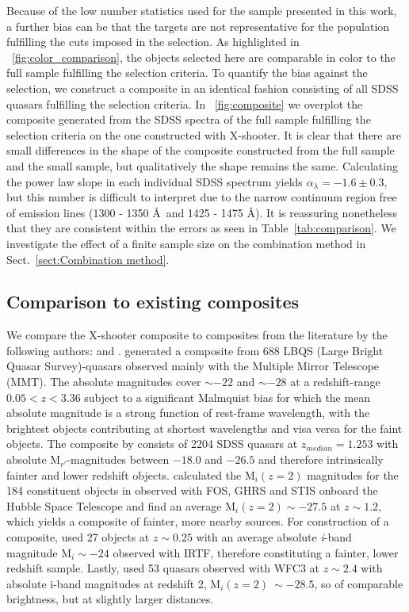 \documentclass{aa}    %
\newcommand{\figref}[1]{\ref{fig:#1}}
\newcommand{\Fig}[1]{\figurename~\figref{#1}}
\newcommand{\fig}[1]{\Fig{#1}}
\newcommand{\Tab}[1]{Table~\ref{tab:#1}}
\newcommand{\tab}[1]{\Tab{#1}}
\newcommand{\sectionname}{Sect.}
\newcommand{\Sect}[1]{\sectionname~\ref{sect:#1}}
\newcommand{\sect}[1]{\Sect{#1}}
\newcommand{\sectlabel}[1]{\label{sect:#1}}
\begin{document}
Because of the low number statistics used for the sample presented in this work, a
further bias can be that the targets are not representative for the
population fulfilling the cuts imposed in the selection. As
highlighted in \fig{color_comparison}, the objects selected here are comparable in color to the full sample fulfilling the selection criteria. To
quantify the bias against the selection, we construct a composite in
an identical fashion consisting of all SDSS quasars fulfilling the
selection criteria.  In \fig{composite} we overplot the composite
generated from the SDSS spectra of the full sample fulfilling the
selection criteria on the one constructed with X-shooter. It is clear
that there are small differences in the shape of the composite
constructed from the full sample and the small sample, but
qualitatively the shape remains the same. Calculating the power law
slope in each individual SDSS spectrum yields $\alpha_\lambda = -1.6\pm 0.3$,
but this number is difficult to interpret due to the narrow continuum
region free of emission lines (1300 - 1350 \AA~and 1425 - 1475
\AA). It is reassuring nonetheless that they are consistent within the
errors as seen in \tab{comparison}. We investigate the effect of a
finite sample size on the combination method in \sect{Combination method}.


\subsection{Comparison to existing composites} \sectlabel{comparison}
We compare the X-shooter composite to composites from the literature by the following authors:
\citet{Francis1991, VandenBerk2001, Telfer2002, Glikman2006} and
\citet{Lusso2015}. \citet{Francis1991} generated a composite from 688
LBQS (Large Bright Quasar Survey)-quasars observed mainly with the Multiple Mirror Telescope (MMT). The absolute magnitudes cover $\sim -22$
and $\sim -28$ at a redshift-range $0.05 < z < 3.36$ subject to a
significant Malmquist bias for which the mean absolute magnitude is a
strong function of rest-frame wavelength, with the brightest objects
contributing at shortest wavelengths and visa versa for the faint
objects. The composite by \citet{VandenBerk2001} consists of 2204 SDSS
quasars at $z_{median} = 1.253$ with absolute M$_{r'}$-magnitudes
between $-18.0$ and $-26.5$ and therefore intrinsically fainter and
lower redshift objects. \citet{Lusso2015} calculated the M$_i(z=2)$
magnitudes for the 184 constituent objects in \citet{Telfer2002}
observed with FOS, GHRS and STIS onboard the Hubble Space Telescope and find an average
M$_i(z=2) \sim -27.5$ at $z \sim 1.2$, which yields a composite of
fainter, more nearby sources. For construction of a composite,
\citet{Glikman2006} used 27 objects at $z \sim 0.25$ with an average
absolute \textit{i}-band magnitude M$_i \sim -24$ observed with IRTF,
therefore constituting a fainter, lower redshift sample. Lastly,
\citet{Lusso2015} used 53 quasars observed with WFC3 at $z \sim 2.4$
with absolute i-band magnitudes at redshift 2, M$_i(z=2) ~\sim -28.5$,
so of comparable brightness, but at slightly larger distances.
\end{document}
